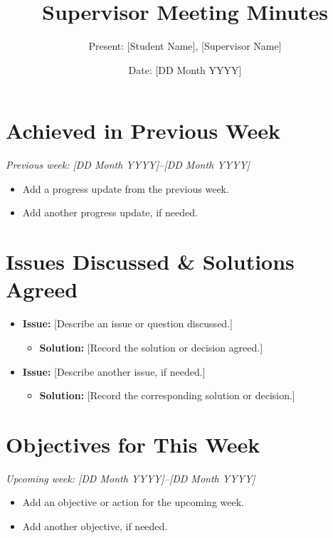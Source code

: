 \documentclass[12pt,a4paper]{article}
\title{\textbf{Supervisor Meeting Minutes}}
\author{Present: [Student Name], [Supervisor Name]}
\date{Date: [DD Month YYYY]}
\begin{document}
\maketitle

\section{Achieved in Previous Week}

\noindent\textit{Previous week: [DD Month YYYY]--[DD Month YYYY]}

\begin{itemize}[leftmargin=*]
    \item Add a progress update from the previous week.
    \item Add another progress update, if needed.
\end{itemize}

\section{Issues Discussed \& Solutions Agreed}

\begin{itemize}[leftmargin=*]
    \item \textbf{Issue:} [Describe an issue or question discussed.]
    \begin{itemize}
        \item \textbf{Solution:} [Record the solution or decision agreed.]
    \end{itemize}
    \item \textbf{Issue:} [Describe another issue, if needed.]
    \begin{itemize}
        \item \textbf{Solution:} [Record the corresponding solution or decision.]
    \end{itemize}
\end{itemize}

\section{Objectives for This Week}

\noindent\textit{Upcoming week: [DD Month YYYY]--[DD Month YYYY]}

\begin{itemize}[leftmargin=*]
    \item Add an objective or action for the upcoming week.
    \item Add another objective, if needed.
\end{itemize}
\end{document}
